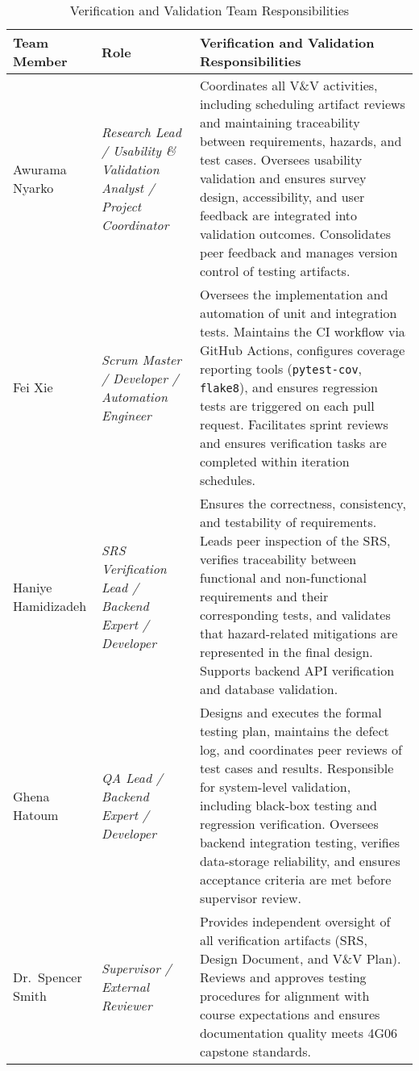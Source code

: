 \documentclass[12pt, titlepage]{article}
\begin{document}
\begin{table}[H]
\centering
\caption{Verification and Validation Team Responsibilities}
\setlength{\tabcolsep}{4pt}
\renewcommand{\arraystretch}{1.2}
\footnotesize

\begin{tabularx}{\textwidth}{l l X}
\toprule
\textbf{Team Member} & \textbf{Role} & \textbf{Verification and Validation Responsibilities} \\
\midrule
\arrayrulecolor[gray]{0.8}
Awurama Nyarko &
\textit{Research Lead / Usability \& Validation Analyst / Project Coordinator} &
Coordinates all V\&V activities, including scheduling artifact reviews and
maintaining traceability between requirements, hazards, and test cases.
Oversees usability validation and ensures survey design, accessibility, and
user feedback are integrated into validation outcomes. Consolidates peer
feedback and manages version control of testing artifacts. \\
\hline
Fei Xie &
\textit{Scrum Master / Developer / Automation Engineer} &
Oversees the implementation and automation of unit and integration tests.
Maintains the CI workflow via GitHub Actions, configures coverage reporting
tools (\texttt{pytest-cov}, \texttt{flake8}), and ensures regression tests are
triggered on each pull request. Facilitates sprint reviews and ensures
verification tasks are completed within iteration schedules. \\
\hline
Haniye Hamidizadeh &
\textit{SRS Verification Lead / Backend Expert / Developer} &
Ensures the correctness, consistency, and testability of requirements. Leads
peer inspection of the SRS, verifies traceability between functional and
non-functional requirements and their corresponding tests, and validates that
hazard-related mitigations are represented in the final design. Supports backend
API verification and database validation. \\
\hline
Ghena Hatoum &
\textit{QA Lead / Backend Expert / Developer} &
Designs and executes the formal testing plan, maintains the defect log, and
coordinates peer reviews of test cases and results. Responsible for system-level
validation, including black-box testing and regression verification. Oversees
backend integration testing, verifies data-storage reliability, and ensures
acceptance criteria are met before supervisor review. \\
\hline
Dr.~Spencer Smith &
\textit{Supervisor / External Reviewer} &
Provides independent oversight of all verification artifacts (SRS, Design
Document, and V\&V Plan). Reviews and approves testing procedures for alignment
with course expectations and ensures documentation quality meets 4G06 capstone
standards. \\
\bottomrule
\end{tabularx}
\end{table}
\end{document}
